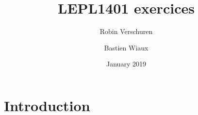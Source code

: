 \documentclass{article}
\title{LEPL1401 exercices}
\author{Robin Verschuren}
\author{Bastien Wiaux}
\date{January 2019}
\begin{document}
\maketitle
\tableofcontents

\section{Introduction}

\end{document}

